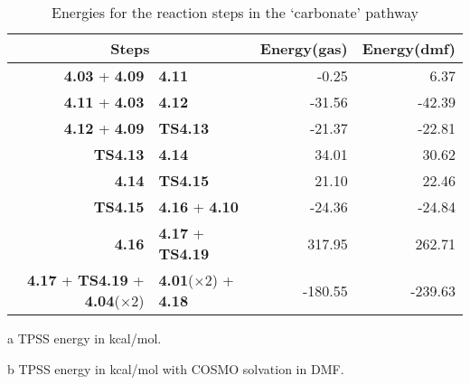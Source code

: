 \begin{table}[!htb]
\centering
 \begin{threeparttable}
  \caption{Energies for the reaction steps in the `carbonate' pathway}
    \begin{tabular}{r@{ $\rightarrow$ }lrr}
    \toprule
    \multicolumn{2}{c}{Steps} & Energy(gas)\tnote{a} & Energy(dmf)\tnote{b} \\
    \midrule
    \textbf{4.03} + \textbf{4.09} & \textbf{4.11} & -0.25 & 6.37 \\
    \textbf{4.11} + \textbf{4.03} & \textbf{4.12} & -31.56 & -42.39 \\
    \textbf{4.12} + \textbf{4.09} & \textbf{TS4.13} & -21.37 & -22.81 \\
    \textbf{TS4.13} & \textbf{4.14} & 34.01 & 30.62 \\
    \textbf{4.14} & \textbf{TS4.15} & 21.10 & 22.46 \\
    \textbf{TS4.15} & \textbf{4.16} + \textbf{4.10} & -24.36 & -24.84 \\
    \textbf{4.16} & \textbf{4.17} + \textbf{TS4.19} & 317.95 & 262.71 \\
    \textbf{4.17} + \textbf{TS4.19} + \textbf{4.04}($\times 2$) & \textbf{4.01}($\times 2$) + \textbf{4.18} & -180.55 & -239.63 \\
    \bottomrule
    \end{tabular}%
    \begin{tablenotes}
    \item [a] TPSS energy in kcal/mol.
    \item [b] TPSS energy in kcal/mol with COSMO solvation in DMF.
    \end{tablenotes}
  \label{tab.carbrxn}%
 \end{threeparttable}
\end{table}%
